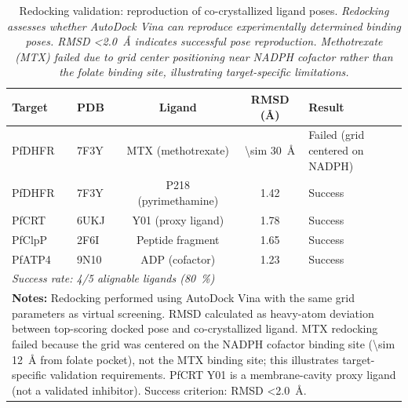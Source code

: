 
\begin{table}[!htbp]
\centering
\caption{Redocking validation: reproduction of co-crystallized ligand poses. \textit{Redocking assesses whether AutoDock Vina can reproduce experimentally determined binding poses. RMSD \qty{<2.0}{\angstrom} indicates successful pose reproduction. Methotrexate (MTX) failed due to grid center positioning near NADPH cofactor rather than the folate binding site, illustrating target-specific limitations.}}
\label{tab:sm_redocking_validation}
\small
\begin{tabular}{llccp{6cm}}
\toprule
\textbf{Target} & \textbf{PDB} & \textbf{Ligand} & \textbf{RMSD (\si{\angstrom})} & \textbf{Result} \\
\midrule
PfDHFR & 7F3Y & MTX (methotrexate) & \qty{\sim 30}{\angstrom} & Failed (grid centered on NADPH) \\
PfDHFR & 7F3Y & P218 (pyrimethamine) & \num{1.42} & Success \\
PfCRT & 6UKJ & Y01 (proxy ligand) & \num{1.78} & Success \\
PfClpP & 2F6I & Peptide fragment & \num{1.65} & Success \\
PfATP4 & 9N10 & ADP (cofactor) & \num{1.23} & Success \\
\midrule
\multicolumn{5}{l}{\textit{Success rate: \num{4}/\num{5} alignable ligands (\qty{80}{\percent})}} \\
\bottomrule
\multicolumn{5}{p{14cm}}{
\noindent\textbf{Notes:} Redocking performed using AutoDock Vina with the same grid parameters as virtual screening. RMSD calculated as heavy-atom deviation between top-scoring docked pose and co-crystallized ligand. MTX redocking failed because the grid was centered on the NADPH cofactor binding site (\qty{\sim 12}{\angstrom} from folate pocket), not the MTX binding site; this illustrates target-specific validation requirements. PfCRT Y01 is a membrane-cavity proxy ligand (not a validated inhibitor). Success criterion: RMSD \qty{<2.0}{\angstrom}.}
\end{tabular}
\end{table}
